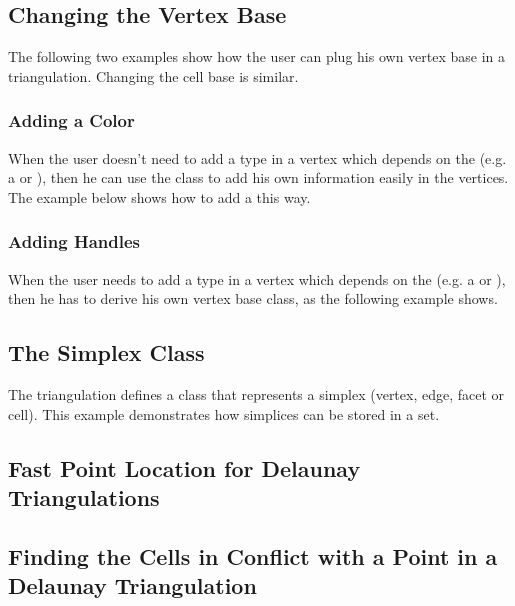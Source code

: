\subsection{Changing the Vertex Base}
The following two examples show how the user can plug his own vertex base in a
triangulation.  Changing the cell base is similar.

\subsubsection{Adding a Color\label{Triangulation3-sec-examples-color}}
When the user doesn't need to add a type in a vertex which depends on the
 (e.g. a  or
), then he can use the
 class to add his own information
easily in the vertices.  The example below shows how to add a 
this way.


\subsubsection{Adding Handles}
When the user needs to add a type in a vertex which depends on the
 (e.g. a  or
), then he has to derive his own vertex base class,
as the following example shows.


\subsection{The Simplex Class\label{Triangulation3-sec-simplex}}
The triangulation defines a  class that represents a
simplex (vertex, edge, facet or cell). This example demonstrates how
simplices can be stored in a set.



\subsection{Fast Point Location for Delaunay Triangulations\label{Triangulation3-ex-fast-location}}


\subsection{Finding the Cells in Conflict with a Point in a Delaunay
Triangulation}

